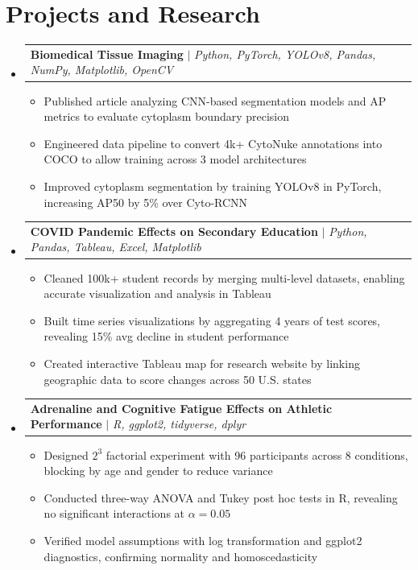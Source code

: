 \documentclass[letterpaper,11pt]{article}
\makeatletter
\newcommand{\resumeItem}[1]{
  \item\small{#1}
}
\newcommand{\resumeProjectHeading}[2]{
    \item
    \begin{tabular*}{\textwidth}{l@{\extracolsep{\fill}}r}
      #1 & #2 \\
    \end{tabular*}\vspace{-7pt}
}
\newcommand{\resumeSubHeadingListStart}{\begin{itemize}[leftmargin=0in, label={}]}
\newcommand{\resumeSubHeadingListEnd}{\end{itemize}}
\newcommand{\resumeItemListStart}{\begin{itemize}[itemsep= 1.5pt, parsep=0pt]}
\newcommand{\resumeItemListEnd}{\end{itemize}\vspace{-5pt}}
\makeatother
\begin{document}
\section{Projects and Research}
    \resumeSubHeadingListStart
      \resumeProjectHeading
          {\textbf{Biomedical Tissue Imaging} $|$ \textit{Python, PyTorch, YOLOv8, Pandas, NumPy, Matplotlib, OpenCV}}{}
          \resumeItemListStart
            \resumeItem{Published article analyzing CNN-based segmentation models and AP metrics to evaluate cytoplasm boundary precision}
            \resumeItem{Engineered data pipeline to convert 4k+ CytoNuke annotations into COCO to allow training across 3 model architectures}
            \resumeItem{Improved cytoplasm segmentation by training YOLOv8 in PyTorch, increasing AP50 by 5\% over Cyto-RCNN}
          \resumeItemListEnd
      \resumeProjectHeading
          {\textbf{COVID Pandemic Effects on Secondary Education} $|$ \textit{Python, Pandas, Tableau, Excel, Matplotlib}}{}
          \resumeItemListStart
            \resumeItem{Cleaned 100k+ student records by merging multi-level datasets, enabling accurate visualization and analysis in Tableau}
            \resumeItem{Built time series visualizations by aggregating 4 years of test scores, revealing 15\% avg decline in student performance}
            \resumeItem{Created interactive Tableau map for research website by linking geographic data to score changes across 50 U.S. states}
          \resumeItemListEnd
      \resumeProjectHeading
          {\textbf{Adrenaline and Cognitive Fatigue Effects on Athletic Performance} $|$ \textit{R, ggplot2, tidyverse, dplyr}}{}
          \resumeItemListStart
            \resumeItem{Designed $2^3$ factorial experiment with 96 participants across 8 conditions, blocking by age and gender to reduce variance}
            \resumeItem{Conducted three-way ANOVA and Tukey post hoc tests in R, revealing no significant interactions at $\alpha = 0.05$}
            \resumeItem{Verified model assumptions with log transformation and ggplot2 diagnostics, confirming normality and homoscedasticity}
          \resumeItemListEnd
    \resumeSubHeadingListEnd
\end{document}

